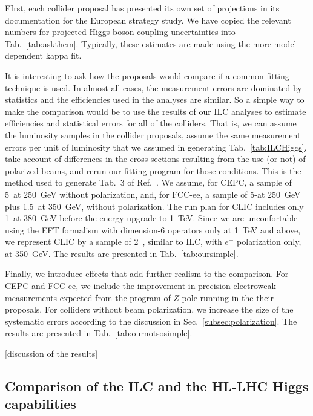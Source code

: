 FIrst, each collider proposal has presented its own set of projections in its documentation for the European strategy study.   We have copied the relevant numbers for projected Higgs boson coupling uncertainties into Tab.~\ref{tab:askthem}.  Typically, these estimates are made using the more model-dependent kappa fit.

It is interesting to ask how the proposals would compare if a common fitting technique is used. In almost all cases, the measurement errors are dominated by statistics and the efficiencies used in the analyses are similar.  So a simple way to make the comparison would be to use the results of our ILC analyses to estimate efficiencies and statistical errors for all of the colliders.  That is, we can  assume the luminosity samples in the collider proposals, assume the same measurement errors per unit of luminosity that we assumed in generating Tab.~\ref{tab:ILCHiggs},  take account of differences in the cross sections resulting from the use (or not) of polarized beams, and rerun our fitting  program for those conditions.   This is the method used to generate Tab.~3 of Ref.~\cite{Barklow:2017suo}.   We assume, for CEPC, a sample of  5~\iab at 250~GeV without polarization, and, for FCC-ee, a sample of 5-\iab at 250~GeV plus 1.5~\iab at 350~GeV,
without polarization.  The run plan for CLIC includes only 1~\iab at 380~GeV before the energy upgrade to 1~TeV.  Since we are unconfortable using the EFT formalism with dimension-6 operators only at 1~TeV and above, we represent CLIC by a sample of
2~\iab, similar to ILC, with $e^-$ polarization only, at 350~GeV.  The results are presented in Tab.~\ref{tab:oursimple}. 

Finally, we introduce effects that add further realism to the comparison.  For CEPC and FCC-ee, we include the improvement in precision electroweak measurements expected from the program of $Z$ pole running in the their proposals.  For colliders without beam polarization, we increase the size of the systematic errors according to the discussion in  Sec.~\ref{subsec:polarization}. The results are presented in 
Tab.~\ref{tab:ournotsosimple}. 


[discussion of the results]



\subsection{Comparison of the ILC and the HL-LHC Higgs capabilities}
\label{subsec:higgs:ilclhc}





